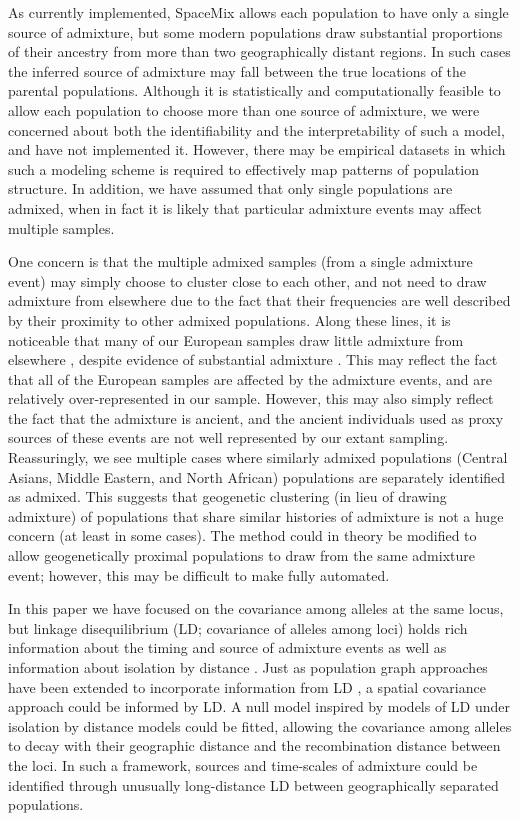 \documentclass[12pt]{article}
\begin{document}
As currently implemented, SpaceMix allows each population to have only a single source of admixture, 
but some modern populations draw substantial proportions of their ancestry from more than two geographically distant regions.
In such cases the inferred source of admixture may fall between the true locations of the parental populations.  
Although it is statistically and computationally feasible to allow each population to choose more than one source of admixture, 
we were concerned about both the identifiability and the interpretability of such a model, and have not implemented it.
However, there may be empirical datasets in which such a modeling scheme is required to effectively map patterns of population structure.
In addition, we have assumed that only single populations are admixed, when in fact it is likely that particular admixture events may affect multiple samples.

One concern is that the multiple admixed samples (from a single admixture event) may simply choose to cluster close to each other, 
and not need to draw admixture from elsewhere due to the fact that their frequencies are well described by their proximity to other admixed populations.  
Along these lines, it is noticeable that many of our European samples draw little admixture from elsewhere \citep[also noted by][ using a different approach]{Hellenthal}, 
despite evidence of substantial admixture \citep{lazaridis_ancient_2014}.
This may reflect the fact that all of the European samples are affected by the admixture events, and are relatively over-represented in our sample. 
However, this may also simply reflect the fact that the admixture is ancient, 
and the ancient individuals used as proxy sources of these events are not well represented by our extant sampling. 
Reassuringly, we see multiple cases where similarly admixed populations (Central Asians, Middle Eastern, and North African) 
populations are separately identified as admixed. 
This suggests that geogenetic clustering (in lieu of drawing admixture) of populations that share similar histories of admixture is not a huge concern 
(at least in some cases). 
The method could in theory be modified to allow geogenetically proximal populations to draw from the same admixture event;
however, this may be difficult to make fully automated.

In this paper we have focused on the covariance among alleles at the same locus, 
but linkage disequilibrium (LD; covariance of alleles among loci) 
holds rich information about the timing and source of admixture events \citep[e.g.][]{chakraborty_admixture_1988,moorjani_india_2013, Hellenthal,gravel_population_2012} 
as well as information about isolation by distance \citep{ralph2013geography}.
Just as population graph approaches have been extended to incorporate information from LD \citep{Loh:13}, 
a spatial covariance approach could be informed by LD. 
A null model inspired by models of LD under isolation by distance models \citep{Arkendra2007,Barton2013} could be fitted, 
allowing the covariance among alleles to decay with their geographic distance and the recombination distance between the loci. 
In such a framework, sources and time-scales of admixture could be identified through unusually long-distance LD between geographically separated populations. 
\end{document}
